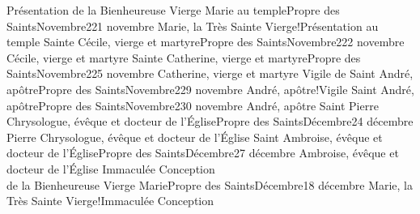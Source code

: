 \documentclass[twoside, french]{book}
\begin{document}
        {Présentation de la Bienheureuse Vierge Marie au temple}{Propre des Saints}{Novembre}{2}{21 novembre}
        {}{}{Marie, la Très Sainte Vierge!Présentation au temple}{}{}
        {Sainte Cécile, vierge et martyre}{Propre des Saints}{Novembre}{2}{22 novembre}
        {}{}{Cécile, vierge et martyre}{}{}
        {Sainte Catherine, vierge et martyre}{Propre des Saints}{Novembre}{2}{25 novembre}
        {}{}{Catherine, vierge et martyre}{}{}
        {Vigile de Saint André, apôtre}{Propre des Saints}{Novembre}{2}{29 novembre}
        {}{}{André, apôtre!Vigile}{}{}
        {Saint André, apôtre}{Propre des Saints}{Novembre}{2}{30 novembre}
        {}{}{André, apôtre}{}{}
        {Saint Pierre Chrysologue, évêque et docteur de l’Église}{Propre des Saints}{Décembre}{2}{4 décembre}
        {}{}{Pierre Chrysologue, évêque et docteur de l’Église}{}{}
        {Saint Ambroise, évêque et docteur de l’Église}{Propre des Saints}{Décembre}{2}{7 décembre}
        {}{}{Ambroise, évêque et docteur de l’Église}{}{}
        {Immaculée Conception\\de la Bienheureuse Vierge Marie}{Propre des Saints}{Décembre}{1}{8 décembre}
        {}{}{Marie, la Très Sainte Vierge!Immaculée Conception}{}{}
\end{document}
